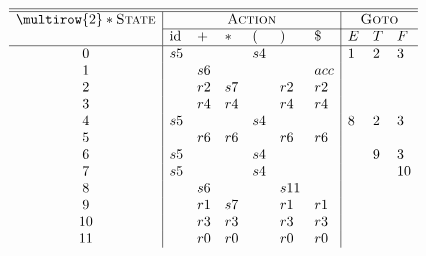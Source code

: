 \centering
\small
$\begin{array}{c|llllll|lll}
\hline\hline
\multirow{2}*{\textsc{State}} & \multicolumn{6}{c|}{\textsc{Action}} & \multicolumn{3}{c}{\textsc{Goto}} \\\cline{2-10}
                             & \text{id} & + & * & ( & ) & \$         & E & T & F \\
\hline
0  & s5 &    &    & s4 &    &  & 1 & 2 & 3  \\
1  &    & s6 &    &    &    & acc           \\
2  &    & r2 & s7 &    & r2 & r2            \\
3  &    & r4 & r4 &    & r4 & r4            \\
4  & s5 &    &    & s4 &    &  & 8 & 2 & 3  \\
5  &    & r6 & r6 &    & r6 & r6            \\
6  & s5 &    &    & s4 &    &  &   & 9 & 3  \\
7  & s5 &    &    & s4 &    &  &   &   & 10 \\
8  &    & s6 &    &    & s11&               \\
9  &    & r1 & s7 &    & r1 & r1            \\
10 &    & r3 & r3 &    & r3 & r3            \\
11 &    & r0 & r0 &    & r0 & r0
\end{array}$